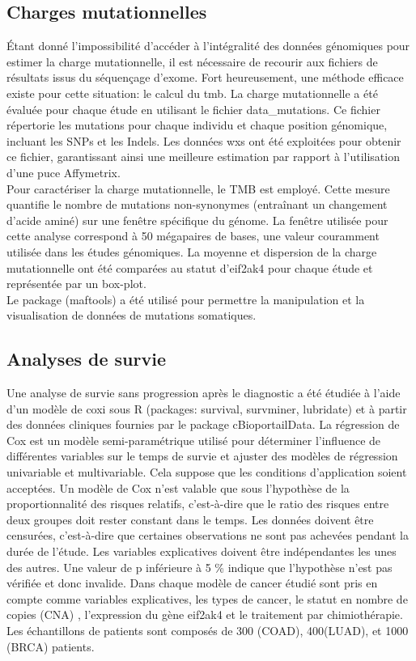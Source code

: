 \documentclass{style}
\begin{document}
\subsection{Charges mutationnelles}
Étant donné l'impossibilité d'accéder à l'intégralité des données génomiques pour estimer la charge mutationnelle, il est nécessaire de recourir aux fichiers de résultats issus du séquençage d'exome. Fort heureusement, une méthode efficace existe pour cette situation: le calcul du \acrfull{tmb}.
La charge mutationnelle a été évaluée pour chaque étude en utilisant le fichier data\_mutations. Ce fichier répertorie les mutations pour chaque individu et chaque position génomique, incluant les SNPs et les Indels. Les données \acrfull{wxs} ont été exploitées pour obtenir ce fichier, garantissant ainsi une meilleure estimation par rapport à l'utilisation d'une puce Affymetrix. \\
Pour caractériser la charge mutationnelle, le TMB est employé. Cette mesure quantifie le nombre de mutations non-synonymes (entraînant un changement d'acide aminé) sur une fenêtre spécifique du génome. La fenêtre utilisée pour cette analyse correspond à 50 mégapaires de bases, une valeur couramment utilisée dans les études génomiques.
La moyenne et dispersion de la charge mutationnelle ont été comparées au statut d’eif2ak4 pour chaque étude et représentée par un box-plot. \\
Le package (maftools) a été utilisé pour permettre la manipulation et la visualisation de données de mutations somatiques.

\subsection{Analyses de survie}
Une analyse de survie sans progression après le diagnostic a été étudiée à l’aide d’un modèle de \acrfull{coxi} sous R (packages:  survival, survminer, lubridate) et à partir des données cliniques fournies par le package cBioportailData.
La régression de Cox est un modèle semi-paramétrique utilisé pour déterminer l'influence de différentes variables sur le temps de survie et ajuster des modèles de régression univariable et multivariable. Cela suppose que les conditions d’application soient acceptées.  Un modèle de Cox n’est valable que sous l’hypothèse de la proportionnalité des risques relatifs, c'est-à-dire que le ratio des risques entre deux groupes doit rester constant dans le temps. Les données doivent être censurées, c'est-à-dire que certaines observations ne sont pas achevées pendant la durée de l'étude. Les variables explicatives doivent être indépendantes les unes des autres. Une valeur de p inférieure à 5 \% indique que l’hypothèse n’est pas vérifiée et donc invalide.
Dans chaque modèle de cancer étudié sont pris en compte comme variables explicatives, les types de cancer, le statut en nombre de copies (CNA) , l’expression du gène eif2ak4 et le traitement par chimiothérapie. Les échantillons de patients sont composés de 300 (COAD), 400(LUAD), et 1000 (BRCA) patients.
\end{document}
